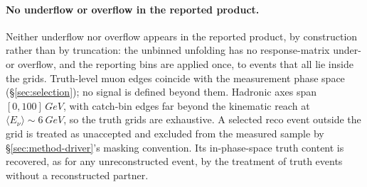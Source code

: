 \paragraph{No underflow or overflow in the reported product.} Neither underflow nor overflow appears in the reported product, by construction rather than by truncation: the unbinned unfolding has no response-matrix under- or overflow, and the reporting bins are applied once, to events that all lie inside the grids. Truth-level muon edges coincide with the measurement phase space (\S\ref{sec:selection}); no signal is defined beyond them. Hadronic axes span $[0,100]\,\si{GeV}$, with catch-bin edges far beyond the kinematic reach at $\langle E_\nu\rangle\sim\SI{6}{GeV}$, so the truth grids are exhaustive. A selected reco event outside the grid is treated as unaccepted and excluded from the measured sample by \S\ref{sec:method-driver}'s masking convention. Its in-phase-space truth content is recovered, as for any unreconstructed event, by the treatment of truth events without a reconstructed partner.

